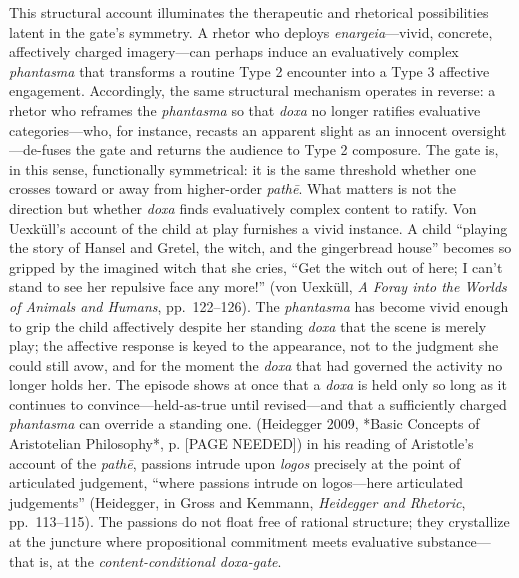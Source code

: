 \documentclass{article}
\begin{document}
This structural account illuminates the therapeutic and rhetorical possibilities latent in the gate's symmetry. A rhetor who deploys \textit{enargeia}---vivid, concrete, affectively charged imagery---can perhaps induce an evaluatively complex \textit{phantasma} that transforms a routine Type 2 encounter into a Type 3 affective engagement. Accordingly, the same structural mechanism operates in reverse: a rhetor who reframes the \textit{phantasma} so that \textit{doxa} no longer ratifies evaluative categories---who, for instance, recasts an apparent slight as an innocent oversight---de-fuses the gate and returns the audience to Type 2 composure. The gate is, in this sense, functionally symmetrical: it is the same threshold whether one crosses toward or away from higher-order \textit{pathē}. What matters is not the direction but whether \textit{doxa} finds evaluatively complex content to ratify. Von Uexküll's account of the child at play furnishes a vivid instance. A child ``playing the story of Hansel and Gretel, the witch, and the gingerbread house'' becomes so gripped by the imagined witch that she cries, ``Get the witch out of here; I can't stand to see her repulsive face any more!'' (von Uexküll, \textit{A Foray into the Worlds of Animals and Humans}, pp.~122--126). The \textit{phantasma} has become vivid enough to grip the child affectively despite her standing \textit{doxa} that the scene is merely play; the affective response is keyed to the appearance, not to the judgment she could still avow, and for the moment the \textit{doxa} that had governed the activity no longer holds her. The episode shows at once that a \textit{doxa} is held only so long as it continues to convince---held-as-true until revised---and that a sufficiently charged \textit{phantasma} can override a standing one. (Heidegger 2009, *Basic Concepts of Aristotelian Philosophy*, p. [PAGE NEEDED]) in his reading of Aristotle's account of the \textit{pathē}, passions intrude upon \textit{logos} precisely at the point of articulated judgement, ``where passions intrude on logos---here articulated judgements'' (Heidegger, in Gross and Kemmann, \textit{Heidegger and Rhetoric}, pp.~113--115). The passions do not float free of rational structure; they crystallize at the juncture where propositional commitment meets evaluative substance---that is, at the \textit{content-conditional doxa-gate}.
\end{document}
